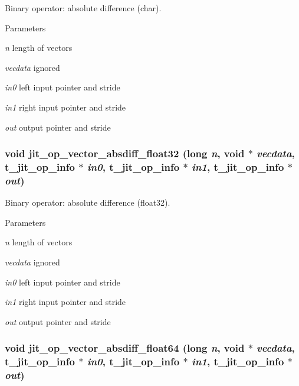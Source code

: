 Binary operator: absolute difference (char). 
\begin{DoxyParams}{Parameters}
\item[{\em n}]length of vectors \item[{\em vecdata}]ignored \item[{\em in0}]left input pointer and stride \item[{\em in1}]right input pointer and stride \item[{\em out}]output pointer and stride \end{DoxyParams}
\hypertarget{group__opvecmod_ga8d6b5c9c995ed85836407486c1338cc5}{
\subsubsection[{jit\_\-op\_\-vector\_\-absdiff\_\-float32}]{\setlength{\rightskip}{0pt plus 5cm}void jit\_\-op\_\-vector\_\-absdiff\_\-float32 (long {\em n}, \/  void $\ast$ {\em vecdata}, \/  {\bf t\_\-jit\_\-op\_\-info} $\ast$ {\em in0}, \/  {\bf t\_\-jit\_\-op\_\-info} $\ast$ {\em in1}, \/  {\bf t\_\-jit\_\-op\_\-info} $\ast$ {\em out})}}
\label{group__opvecmod_ga8d6b5c9c995ed85836407486c1338cc5}


Binary operator: absolute difference (float32). 
\begin{DoxyParams}{Parameters}
\item[{\em n}]length of vectors \item[{\em vecdata}]ignored \item[{\em in0}]left input pointer and stride \item[{\em in1}]right input pointer and stride \item[{\em out}]output pointer and stride \end{DoxyParams}
\hypertarget{group__opvecmod_ga237b6d40cedfb2768fd1632dae8f234b}{
\subsubsection[{jit\_\-op\_\-vector\_\-absdiff\_\-float64}]{\setlength{\rightskip}{0pt plus 5cm}void jit\_\-op\_\-vector\_\-absdiff\_\-float64 (long {\em n}, \/  void $\ast$ {\em vecdata}, \/  {\bf t\_\-jit\_\-op\_\-info} $\ast$ {\em in0}, \/  {\bf t\_\-jit\_\-op\_\-info} $\ast$ {\em in1}, \/  {\bf t\_\-jit\_\-op\_\-info} $\ast$ {\em out})}}
\label{group__opvecmod_ga237b6d40cedfb2768fd1632dae8f234b}


